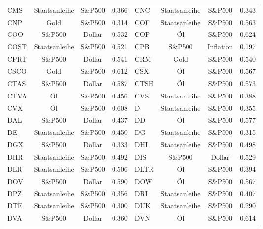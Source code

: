 \begin{longtable}{l c c c | l c c c}
    CMS    & Staatsanleihe & S\&P500   & 0.366         & CNC    & Staatsanleihe & S\&P500   & 0.343         \\
    CNP    & Gold          & S\&P500   & 0.314         & COF    & Staatsanleihe & S\&P500   & 0.563         \\
    COO    & S\&P500       & Dollar    & 0.532         & COP    & Öl            & S\&P500   & 0.624         \\
    COST   & Staatsanleihe & S\&P500   & 0.521         & CPB    & S\&P500       & Inflation & 0.197         \\
    CPRT   & S\&P500       & Dollar    & 0.541         & CRM    & Gold          & S\&P500   & 0.540         \\
    CSCO   & Gold          & S\&P500   & 0.612         & CSX    & Öl            & S\&P500   & 0.567         \\
    CTAS   & S\&P500       & Dollar    & 0.587         & CTSH   & Öl            & S\&P500   & 0.573         \\
    CTVA   & Öl            & S\&P500   & 0.456         & CVS    & Staatsanleihe & S\&P500   & 0.388         \\
    CVX    & Öl            & S\&P500   & 0.608         & D      & Staatsanleihe & S\&P500   & 0.355         \\
    DAL    & S\&P500       & Dollar    & 0.437         & DD     & Öl            & S\&P500   & 0.577         \\
    DE     & Staatsanleihe & S\&P500   & 0.450         & DG     & Staatsanleihe & S\&P500   & 0.315         \\
    DGX    & S\&P500       & Dollar    & 0.333         & DHI    & Staatsanleihe & S\&P500   & 0.498         \\
    DHR    & Staatsanleihe & S\&P500   & 0.492         & DIS    & S\&P500       & Dollar    & 0.529         \\
    DLR    & Staatsanleihe & S\&P500   & 0.506         & DLTR   & Öl            & S\&P500   & 0.394         \\
    DOV    & S\&P500       & Dollar    & 0.590         & DOW    & Öl            & S\&P500   & 0.567         \\
    DPZ    & Staatsanleihe & S\&P500   & 0.356         & DRI    & Staatsanleihe & S\&P500   & 0.407         \\
    DTE    & Staatsanleihe & S\&P500   & 0.300         & DUK    & Staatsanleihe & S\&P500   & 0.290         \\
    DVA    & S\&P500       & Dollar    & 0.360         & DVN    & Öl            & S\&P500   & 0.614         \\

\end{longtable}
